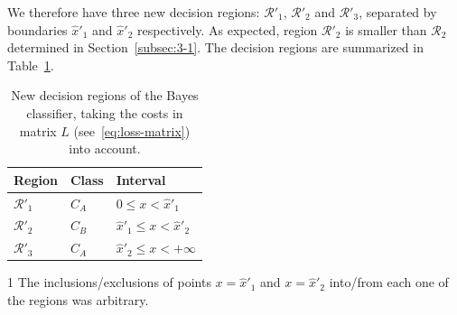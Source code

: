 \documentclass[paper=a4, fontsize=11pt]{scrartcl} %
\numberwithin{equation}{section} %
\numberwithin{figure}{section} %
\numberwithin{table}{section} %
\begin{document}
We therefore have three new decision regions: $\mathcal{R}'_{1}$, $\mathcal{R}'_{2}$ and 
$\mathcal{R}'_{3}$, separated by boundaries $\hat{x}'_{1}$ and $\hat{x}'_{2}$ 
respectively. As expected, region $\mathcal{R}'_{2}$ is smaller than 
$\mathcal{R}_{2}$ determined in Section~\ref{subsec:3-1}. The decision regions 
are summarized in Table~\ref{tab:3-3}.\\

\begin{table}[H]
\begin{center}
    \begin{threeparttable}
    \small
        \begin{tabularx}{0.60\textwidth}{ X | X | X  }
            \textbf{Region}     & \textbf{Class} & \textbf{Interval\tnote{1}}\\ [0.5ex]
            \hline
            $\mathcal{R}'_{1}$   & $C_A$ & $ 0 \le x < \hat{x}'_1$ \\ [0.5ex]
            $\mathcal{R}'_{2}$   & $C_B$ & $ \hat{x}'_1 \le x < \hat{x}'_2$\\ [0.5ex]
            $\mathcal{R}'_{3}$   & $C_A$ & $ \hat{x}'_2 \le x < +\infty$\\ [0.5ex]
        \end{tabularx}

        \begin{tablenotes}
            \footnotesize
            \item[1]The inclusions\slash exclusions of points $x = \hat{x}'_1$ 
            and $x = \hat{x}'_2$ into\slash from each one of the regions was 
            arbitrary.
        \end{tablenotes}
    \caption{New decision regions of the Bayes classifier, taking the costs in 
            matrix $L$ (see~\ref{eq:loss-matrix}) into account.}
    \label{tab:3-3}
    \end{threeparttable}
    \end{center}
\end{table}



\end{document}

